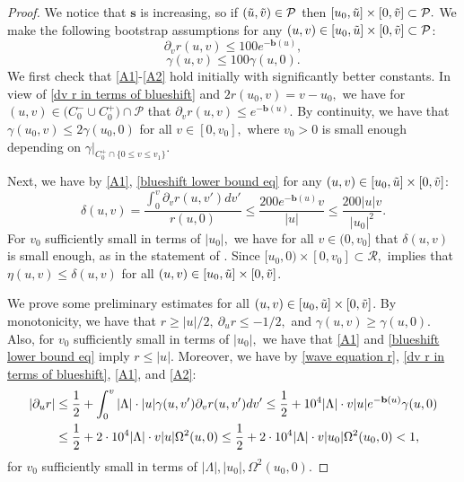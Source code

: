 \documentclass[11pt]{article}
\numberwithin{equation}{section}
\begin{document}
\begin{proof}
    We notice that $\mathbf{s}$ is increasing, so if $(\Tilde{u},\Tilde{v})\in\mathcal{P}$ then $[u_0,\Tilde{u}]\times[0,\Tilde{v}]\subset\mathcal{P}.$ We make the following bootstrap assumptions for any $(u,v)\in[u_0,\Tilde{u}]\times[0,\Tilde{v}]\subset\mathcal{P}$:
\begin{equation}\label{A1}
    \partial_vr(u,v)\leq 100e^{-\mathbf{b}(u)},
\end{equation}
\begin{equation}\label{A2}
    \gamma(u,v)\leq 100\gamma(u,0).
\end{equation}
We first check that \eqref{A1}-\eqref{A2} hold initially with significantly better constants. In view of \eqref{dv r in terms of blueshift} and $2r(u_0,v)=v-u_0,$ we have for $(u,v)\in\big(C_0^-\cup C_0^+\big)\cap\mathcal{P}$ that $\partial_vr(u,v)\leq e^{-\mathbf{b}(u)}.$ By continuity, we have that $\gamma(u_0,v)\leq2\gamma(u_0,0)$ for all $v\in[0,v_0],$ where $v_0>0$ is small enough depending on $\gamma|_{C_0^+\cap\{0\leq v\leq v_1\}}$. 

Next, we have by \eqref{A1}, \eqref{blueshift lower bound eq} for any $(u,v)\in[u_0,\Tilde{u}]\times[0,\Tilde{v}]$:
\begin{equation}\label{bound for delta locally naked}
    \delta(u,v)=\frac{\int_0^v\partial_vr(u,v')dv'}{r(u,0)}\leq\frac{200e^{-\mathbf{b}(u)}v}{|u|}\leq\frac{200|u|v}{|u_0|^2}.
\end{equation}
For $v_0$ sufficiently small in terms of $|u_0|,$ we have for all $v\in(0,v_0]$ that $\delta(u,v)$ is small enough, as in the statement of . Since $[u_0,0)\times[0,v_0]\subset\mathcal{R},$  implies that $\eta(u,v)\leq\delta(u,v)$ for all $(u,v)\in[u_0,\Tilde{u}]\times[0,\Tilde{v}]$.

We prove some preliminary estimates for all $(u,v)\in[u_0,\Tilde{u}]\times[0,\Tilde{v}]$. By monotonicity, we have that $r\geq|u|/2,\ \partial_ur\leq-1/2,$ and $\gamma(u,v)\geq\gamma(u,0).$ Also, for $v_0$ sufficiently small in terms of $|u_0|,$ we have that \eqref{A1} and \eqref{blueshift lower bound eq} imply $r\leq|u|.$ Moreover, we have by \eqref{wave equation r}, \eqref{dv r in terms of blueshift}, \eqref{A1}, and \eqref{A2}:
\begin{align}\label{bound for du r locally naked}
    |\partial_ur|&\leq\frac{1}{2}+\int_0^v|\Lambda|\cdot|u|\gamma(u,v')\partial_vr(u,v')dv' \leq\frac{1}{2}+10^4|\Lambda|\cdot v|u|e^{-\mathbf{b}(u)}\gamma(u,0)\\
    &\leq\frac{1}{2}+2\cdot10^4|\Lambda|\cdot v|u|\Omega^2(u,0)\leq\frac{1}{2}+2\cdot10^4|\Lambda|\cdot v|u_0|\Omega^2(u_0,0)<1,\notag
\end{align}
for $v_0$ sufficiently small in terms of $|\Lambda|,|u_0|,\Omega^2(u_0,0).$


\end{proof}
\end{document}
